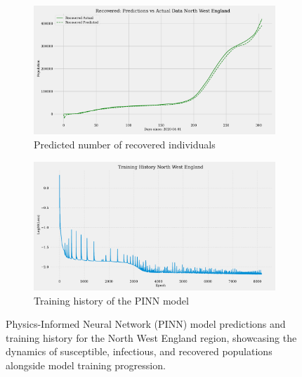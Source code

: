 \documentclass[12pt]{article}
\begin{document}
\begin{figure}
    \begin{subfigure}[t]{0.45\textwidth}
        \includegraphics[width=\textwidth]{images/pinn/R_predictions_North West England.pdf}
        \caption{Predicted number of recovered individuals}
        \label{fig:R_predictions_North West England}
    \end{subfigure}
    \hfill %
    \begin{subfigure}[t]{0.45\textwidth}
        \centering
        \includegraphics[width=\textwidth]{images/pinn/Training_History_North West England.pdf}
        \caption{Training history of the PINN model}
        \label{fig:Training_History_North West England}
    \end{subfigure}
    \caption{Physics-Informed Neural Network (PINN) model predictions and training history for the North West England region, showcasing the dynamics of susceptible, infectious, and recovered populations alongside model training progression.}
    \label{fig:PINN_North West England_Comprehensive}
\end{figure}
\end{document}
